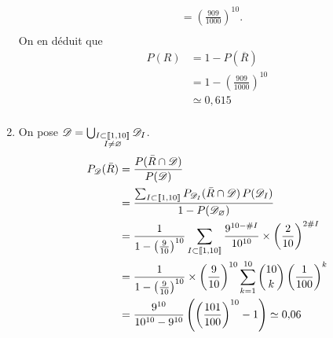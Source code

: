 \begin{enumerate}
\begin{align*}
			&= \left( \frac{909}{1000} \right)^{10}. \\
		\end{align*}
		On en déduit que
		\begin{align*}
			P(R) &= 1 - P(\overline{R})\\
			&= 1 - \left(\frac{909}{1000}\right)^{10} \\
			&\simeq 0,\!615 \\
		\end{align*}
	\item On pose $\mathcal{D} = \bigcup_{\substack{I \subset \left\llbracket 1,10 \right\rrbracket\\I \neq \varnothing}} \mathcal{D}_I$.
		\begin{align*}
			P_{\mathcal{D}}(\bar{R}) &= \frac{P(\bar{R} \cap \mathcal{D})}{P(\mathcal{D})}\\
			&= \frac{\sum_{I \subset \left\llbracket 1,10 \right\rrbracket} P_{\mathcal{D}_I}(\bar{R} \cap \mathcal{D})\,P(\mathcal{D}_I)}{1 - P(\mathcal{D}_\varnothing)} \\
			&= \frac{1}{1-\left( \frac{9}{10} \right)^{10}} \sum_{\substack{I \subset \left\llbracket 1,10 \right\rrbracket}} \frac{9^{10 - \#I}}{10^{10}} \times \left( \frac{2}{10} \right)^{2\#I} \\
			&= \frac{1}{1-\left( \frac{9}{10} \right)^{10}} \times \left( \frac{9}{10} \right)^{10} \sum_{k=1}^{10}{10 \choose k} \left( \frac{1}{100} \right)^k \\
			&= \frac{9^{10}}{10^{10} - 9^{10}} \left( \left( \frac{101}{100} \right)^{10} - 1 \right) \simeq 0,\!06 \\
		\end{align*}
\end{enumerate}

